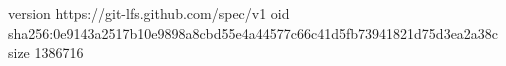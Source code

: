 version https://git-lfs.github.com/spec/v1
oid sha256:0e9143a2517b10e9898a8cbd55e4a44577c66c41d5fb73941821d75d3ea2a38c
size 1386716
